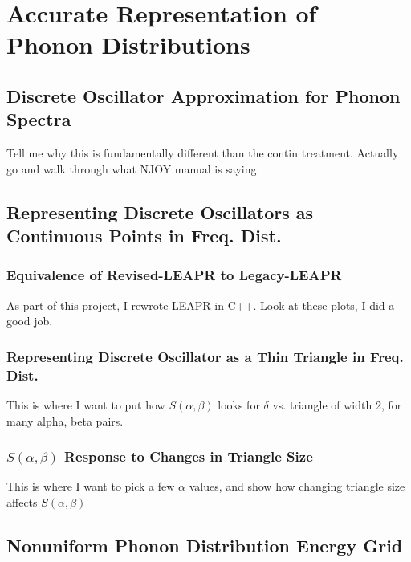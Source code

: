 \documentclass[../master.tex]{subfiles}
\begin{document}
\chapter{Accurate Representation of Phonon Distributions}

	\section{Discrete Oscillator Approximation for Phonon Spectra}
		Tell me why this is fundamentally different than the contin treatment. Actually go and walk through what NJOY manual is saying.

	\section{Representing Discrete Oscillators as Continuous Points in Freq. Dist.}
		\subsection{Equivalence of Revised-LEAPR to Legacy-LEAPR}
			As part of this project, I rewrote LEAPR in C++. Look at these plots, I did a good job.

		\subsection{Representing Discrete Oscillator as a Thin Triangle in Freq. Dist.}
			This is where I want to put how $S(\alpha,\beta)$ looks for $\delta$ vs. triangle of width 2, for many alpha, beta pairs.
		\subsection{$S(\alpha,\beta)$ Response to Changes in Triangle Size} 
			This is where I want to pick a few $\alpha$ values, and show how changing triangle size affects $S(\alpha,\beta)$

	\section{Nonuniform Phonon Distribution Energy Grid}
\end{document}
